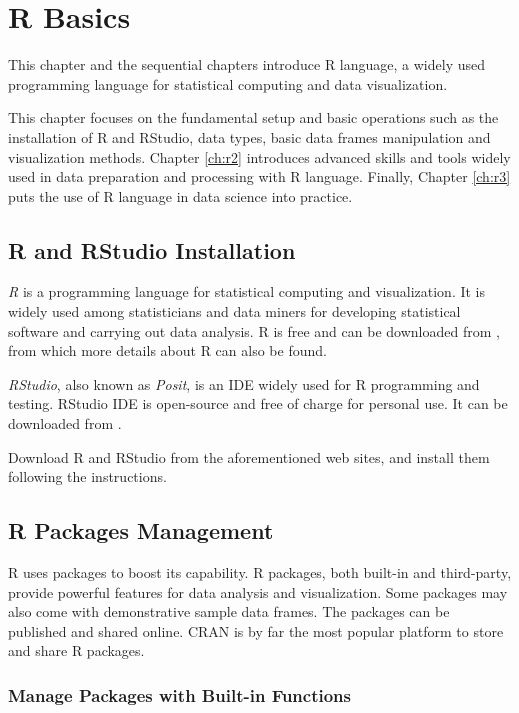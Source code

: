 \chapter{R Basics} \label{ch:r1}

This chapter and the sequential chapters introduce R language, a widely used programming language for statistical computing and data visualization.

This chapter focuses on the fundamental setup and basic operations such as the installation of R and RStudio, data types, basic data frames manipulation and visualization methods. Chapter \ref{ch:r2} introduces advanced skills and tools widely used in data preparation and processing with R language. Finally, Chapter \ref{ch:r3} puts the use of R language in data science into practice.

\section{R and RStudio Installation} \label{ch:r1:sec:rinstallation}

\textit{R} is a programming language for statistical computing and visualization. It is widely used among statisticians and data miners for developing statistical software and carrying out data analysis. R is free and can be downloaded from \cite{r}, from which more details about R can also be found.

\textit{RStudio}, also known as \textit{Posit}, is an IDE widely used for R programming and testing. RStudio IDE is open-source and free of charge for personal use. It can be downloaded from \cite{rstudio}.

Download R and RStudio from the aforementioned web sites, and install them following the instructions.

\section{R Packages Management} \label{ch:r1:sec:rpackage}

R uses packages to boost its capability. R packages, both built-in and third-party, provide powerful features for data analysis and visualization. Some packages may also come with demonstrative sample data frames. The packages can be published and shared online. CRAN is by far the most popular platform to store and share R packages.

\subsection{Manage Packages with Built-in Functions}

